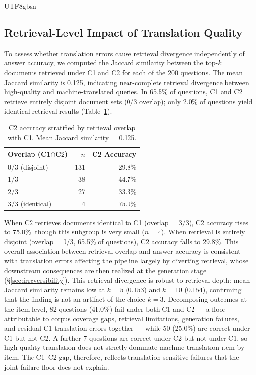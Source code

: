 \documentclass[11pt]{article}
\begin{document}
\begin{CJK}{UTF8}{gbsn}
\subsection{Retrieval-Level Impact of Translation Quality}
\label{sec:retrieval_impact}
To assess whether translation errors cause retrieval divergence independently of answer accuracy, we computed the Jaccard similarity between the top-$k$ documents retrieved under C1 and C2 for each of the 200 questions. The mean Jaccard similarity is 0.125, indicating near-complete retrieval divergence between high-quality and machine-translated queries. In 65.5\% of questions, C1 and C2 retrieve entirely disjoint document sets (0/3 overlap); only 2.0\% of questions yield identical retrieval results (Table~\ref{tab:retrieval_overlap}). 

\begin{table}[ht]
\centering
\begin{tabular}{lrr}
\toprule
\textbf{Overlap (C1$\cap$C2)} & \textbf{$n$} & \textbf{C2 Accuracy} \\
\midrule
0/3 (disjoint) & 131 & 29.8\% \\
1/3 & 38 & 44.7\% \\
2/3 & 27 & 33.3\% \\
3/3 (identical) & 4 & 75.0\% \\
\bottomrule
\end{tabular}
\caption{C2 accuracy stratified by retrieval overlap with C1. Mean Jaccard similarity = 0.125.}
\label{tab:retrieval_overlap}
\end{table}

When C2 retrieves documents identical to C1 (overlap = 3/3), C2 accuracy rises to 75.0\%, though this subgroup is very small ($n = 4$). When retrieval is entirely disjoint (overlap = 0/3, 65.5\% of questions), C2 accuracy falls to 29.8\%. This overall association between retrieval overlap and answer accuracy is consistent with translation errors affecting the pipeline largely by diverting retrieval, whose downstream consequences are then realized at the generation stage (\S\ref{sec:irreversibility}). This retrieval divergence is robust to retrieval depth: mean Jaccard similarity remains low at $k=5$ (0.153) and $k=10$ (0.154), confirming that the finding is not an artifact of the choice $k=3$. Decomposing outcomes at the item level, 82 questions (41.0\%) fail under both C1 and C2 --- a floor attributable to corpus coverage gaps, retrieval limitations, generation failures, and residual C1 translation errors together --- while 50 (25.0\%) are correct under C1 but not C2. A further 7 questions are correct under C2 but not under C1, so high-quality translation does not strictly dominate machine translation item by item. The C1--C2 gap, therefore, reflects translation-sensitive failures that the joint-failure floor does not explain.



\end{CJK}
\end{document}
